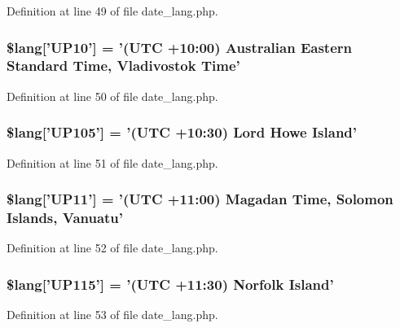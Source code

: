 Definition at line 49 of file date\-\_\-lang.\-php.

\subsubsection[{\$lang}]{\setlength{\rightskip}{0pt plus 5cm}\$lang['U\-P10'] = '(U\-T\-C +10\-:00) Australian Eastern Standard Time, Vladivostok Time'}\label{date__lang_8php_ab55df5b1ac6457c16ea32f01070966f6}


Definition at line 50 of file date\-\_\-lang.\-php.

\subsubsection[{\$lang}]{\setlength{\rightskip}{0pt plus 5cm}\$lang['U\-P105'] = '(U\-T\-C +10\-:30) Lord Howe Island'}\label{date__lang_8php_aeb674ae9d76fd6d0d9c9e77ed5a212e9}


Definition at line 51 of file date\-\_\-lang.\-php.

\subsubsection[{\$lang}]{\setlength{\rightskip}{0pt plus 5cm}\$lang['U\-P11'] = '(U\-T\-C +11\-:00) Magadan Time, Solomon Islands, Vanuatu'}\label{date__lang_8php_a463ad4d63523352c17685f734b4ec7cc}


Definition at line 52 of file date\-\_\-lang.\-php.

\subsubsection[{\$lang}]{\setlength{\rightskip}{0pt plus 5cm}\$lang['U\-P115'] = '(U\-T\-C +11\-:30) Norfolk Island'}\label{date__lang_8php_a46fa8957c8e606d1641bbcdd75cd2df0}


Definition at line 53 of file date\-\_\-lang.\-php.


